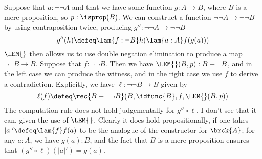  \soln
Suppose that $a : \lnot\lnot A$ and that we have some function $g : A \to B$,
where $B$ is a mere proposition, so $p : \isprop(B)$.  We can construct a
function $\lnot \lnot A \to \lnot \lnot B$ by using contraposition twice,
producing $g'': \lnot \lnot A \to \lnot \lnot B$
\[
    g''(h) \defeq 
    \lam{f : \lnot B}h(\lam{a:A}f(g(a))) 
\]
$\LEM{}$ then allows us to use double negation elimination to produce a map
$\lnot \lnot B \to B$.  Suppose that $f : \lnot \lnot B$.  Then we have
$\LEM{}(B, p) : B + \lnot B$, and in the left case we can produce the witness,
and in the right case we use $f$ to derive a contradiction.  Explicitly, we
have $\ell : \lnot \lnot B \to B$ given by
\[
  \ell(f) \defeq 
  \rec{B + \lnot\lnot B}(B, \idfunc{B}, f, \LEM{}(B, p))
\]
The computation rule does not hold judgementally for $g'' \circ \ell$.  I don't
see that it can, given the use of $\LEM{}$.  Clearly it does hold
propositionally, if one takes $\lvert a \rvert' \defeq \lam{f}f(a)$ to be the
analogue of the constructor for $\brck{A}$; for any $a : A$, we have $g(a) :
B$, and the fact that $B$ is a mere proposition ensures that $(g'' \circ
\ell)(\lvert a \rvert') = g(a)$.
